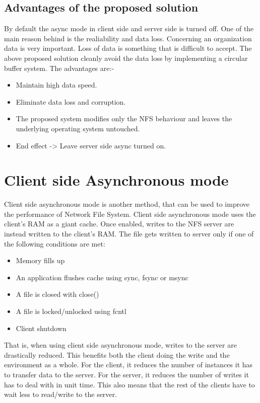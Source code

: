 \documentclass[conference]{IEEEtran}
\begin{document}
\subsection{Advantages of the proposed solution}
By default the async mode in client side and server side is turned off. One of
the main reason behind is the realiability and data loss. Concerning an
organization data is very important. Loss of data is something that is
difficult to accept. The above proposed solution cleanly avoid the data loss 
by implementing a circular buffer system.
The advantages are:-
\begin{itemize}
\item Maintain high data speed.
\item Eliminate data loss and corruption.
\item The proposed system modifies only the NFS behaviour and leaves the underlying operating system untouched.
\item End effect -> Leave server side async turned on.
\end{itemize}

\section{Client side Asynchronous mode}
Client side asynchronous mode is another method, that can be used to improve
the performance of Network File System. Client side asynchronous mode uses
the client's RAM as a giant cache. Once enabled, writes to the NFS server
are instead written to the client's RAM. The file gets written to server 
only if one of the following conditions are met:
\begin{itemize}
\item Memory fills up
\item An application flushes cache using sync, fsync or msync
\item A file is closed with close()
\item A file is locked/unlocked using fcntl
\item Client shutdown
\end{itemize}

That is, when using client side asynchronous mode, writes to the server are
drastically reduced. This benefits both the client doing the write and the
environment as a whole. For the client, it reduces the number of instances
it has to transfer data to the server. For the server, it reduces the
number of writes it has to deal with in unit time. This also means that the
rest of the clients have to wait less to read/write to the server.
\end{document}
